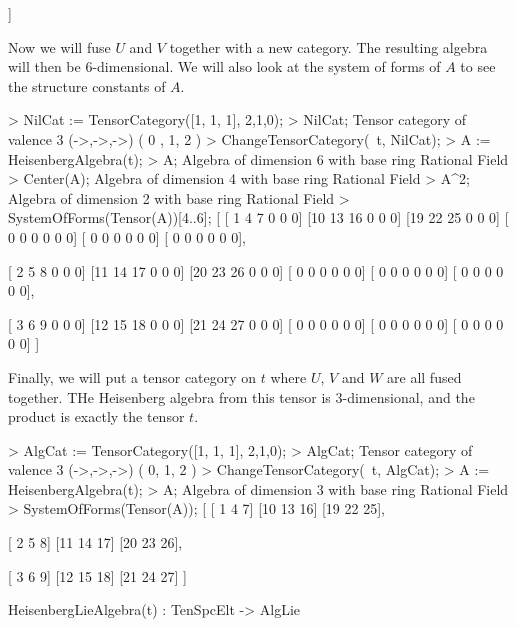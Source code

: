\begin{example}[CraftingAlgebras]
\begin{code}
    [ 0  0  0  3  6  9  0  0  0]
    [ 0  0  0 12 15 18  0  0  0]
    [ 0  0  0 21 24 27  0  0  0]
    [ 0  0  0  0  0  0  0  0  0]
    [ 0  0  0  0  0  0  0  0  0]
    [ 0  0  0  0  0  0  0  0  0]
    [ 0  0  0  0  0  0  0  0  0]
    [ 0  0  0  0  0  0  0  0  0]
    [ 0  0  0  0  0  0  0  0  0]
]
\end{code}

Now we will fuse $U$ and $V$ together with a new category. The resulting algebra
will then be 6-dimensional. We will also look at the system of forms of $A$ to
see the structure constants of $A$. 
\begin{code}
> NilCat := TensorCategory([1, 1, 1], {{2,1},{0}});
> NilCat;
Tensor category of valence 3 (->,->,->) ({ 0 },{ 1, 2 })
> ChangeTensorCategory(~t, NilCat);
> A := HeisenbergAlgebra(t);
> A;
Algebra of dimension 6 with base ring Rational Field
> Center(A);
Algebra of dimension 4 with base ring Rational Field
> A^2;
Algebra of dimension 2 with base ring Rational Field
> SystemOfForms(Tensor(A))[4..6];
[
    [ 1  4  7  0  0  0]
    [10 13 16  0  0  0]
    [19 22 25  0  0  0]
    [ 0  0  0  0  0  0]
    [ 0  0  0  0  0  0]
    [ 0  0  0  0  0  0],

    [ 2  5  8  0  0  0]
    [11 14 17  0  0  0]
    [20 23 26  0  0  0]
    [ 0  0  0  0  0  0]
    [ 0  0  0  0  0  0]
    [ 0  0  0  0  0  0],

    [ 3  6  9  0  0  0]
    [12 15 18  0  0  0]
    [21 24 27  0  0  0]
    [ 0  0  0  0  0  0]
    [ 0  0  0  0  0  0]
    [ 0  0  0  0  0  0]
]
\end{code}

Finally, we will put a tensor category on $t$ where $U$, $V$ and $W$ are all fused together. 
THe Heisenberg algebra from this tensor is 3-dimensional, and the product is exactly the tensor $t$.
\begin{code}
> AlgCat := TensorCategory([1, 1, 1], {{2,1,0}});
> AlgCat;
Tensor category of valence 3 (->,->,->) ({ 0, 1, 2 })
> ChangeTensorCategory(~t, AlgCat);
> A := HeisenbergAlgebra(t);
> A;
Algebra of dimension 3 with base ring Rational Field
> SystemOfForms(Tensor(A));
[
    [ 1  4  7]
    [10 13 16]
    [19 22 25],

    [ 2  5  8]
    [11 14 17]
    [20 23 26],

    [ 3  6  9]
    [12 15 18]
    [21 24 27]
]
\end{code}
\end{example}

\begin{intrinsics}
HeisenbergLieAlgebra(t) : TenSpcElt -> AlgLie
\end{intrinsics}

